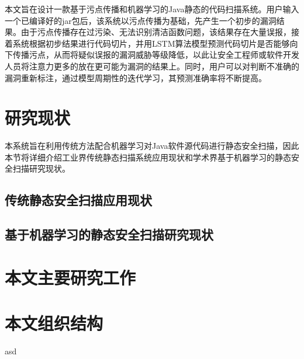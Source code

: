 本文旨在设计一款基于污点传播和机器学习的Java静态的代码扫描系统。用户输入一个已编译好的jar包后，该系统以污点传播为基础，先产生一个初步的漏洞结果。由于污点传播存在过污染、无法识别清洁函数问题，该结果存在大量误报，接着系统根据初步结果进行代码切片，并用LSTM算法模型预测代码切片是否能够向下传播污点，从而将疑似误报的漏洞威胁等级降低，以此让安全工程师或软件开发人员将注意力更多的放在更可能为漏洞的结果上。同时，用户可以对判断不准确的漏洞重新标注，通过模型周期性的迭代学习，其预测准确率将不断提高。

\section{研究现状}
本系统旨在利用传统方法配合机器学习对Java软件源代码进行静态安全扫描，因此本节将详细介绍工业界传统静态扫描系统应用现状和学术界基于机器学习的静态安全扫描研究现状。\\

\subsection{传统静态安全扫描应用现状}

\subsection{基于机器学习的静态安全扫描研究现状}

\section{本文主要研究工作}


\section{本文组织结构}
asd